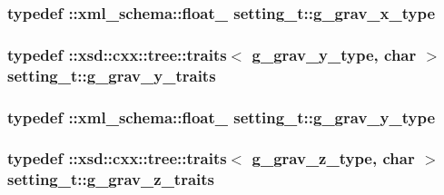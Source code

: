 \subsubsection[{\texorpdfstring{g\+\_\+grav\+\_\+x\+\_\+type}{g_grav_x_type}}]{\setlength{\rightskip}{0pt plus 5cm}typedef \+::{\bf xml\+\_\+schema\+::float\+\_\+} {\bf setting\+\_\+t\+::g\+\_\+grav\+\_\+x\+\_\+type}}\hypertarget{classsetting__t_af2a0b22be63f361de8ba6df7313b1a68}{}\label{classsetting__t_af2a0b22be63f361de8ba6df7313b1a68}
\subsubsection[{\texorpdfstring{g\+\_\+grav\+\_\+y\+\_\+traits}{g_grav_y_traits}}]{\setlength{\rightskip}{0pt plus 5cm}typedef \+::xsd\+::cxx\+::tree\+::traits$<$ {\bf g\+\_\+grav\+\_\+y\+\_\+type}, char $>$ {\bf setting\+\_\+t\+::g\+\_\+grav\+\_\+y\+\_\+traits}}\hypertarget{classsetting__t_ae11d083a1b0c3194a4295bdc5fd79a32}{}\label{classsetting__t_ae11d083a1b0c3194a4295bdc5fd79a32}
\subsubsection[{\texorpdfstring{g\+\_\+grav\+\_\+y\+\_\+type}{g_grav_y_type}}]{\setlength{\rightskip}{0pt plus 5cm}typedef \+::{\bf xml\+\_\+schema\+::float\+\_\+} {\bf setting\+\_\+t\+::g\+\_\+grav\+\_\+y\+\_\+type}}\hypertarget{classsetting__t_a89b3c653de2dc5afa902042e34939589}{}\label{classsetting__t_a89b3c653de2dc5afa902042e34939589}
\subsubsection[{\texorpdfstring{g\+\_\+grav\+\_\+z\+\_\+traits}{g_grav_z_traits}}]{\setlength{\rightskip}{0pt plus 5cm}typedef \+::xsd\+::cxx\+::tree\+::traits$<$ {\bf g\+\_\+grav\+\_\+z\+\_\+type}, char $>$ {\bf setting\+\_\+t\+::g\+\_\+grav\+\_\+z\+\_\+traits}}\hypertarget{classsetting__t_ab6a6497ea3d399fee80102fc84d04397}{}\label{classsetting__t_ab6a6497ea3d399fee80102fc84d04397}
